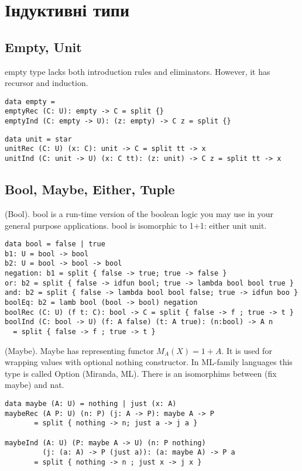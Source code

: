 \section{Індуктивні типи}

\subsection{Empty, Unit}

empty type lacks both introduction rules and eliminators. However, it has recursor and induction.

\begin{lstlisting}
data empty =
emptyRec (C: U): empty -> C = split {}
emptyInd (C: empty -> U): (z: empty) -> C z = split {}
\end{lstlisting}

\begin{lstlisting}
data unit = star
unitRec (C: U) (x: C): unit -> C = split tt -> x
unitInd (C: unit -> U) (x: C tt): (z: unit) -> C z = split tt -> x
\end{lstlisting}

\subsection{Bool, Maybe, Either, Tuple}

\begin{definition} (Bool).
bool is a run-time version of the boolean logic you may use
in your general purpose applications. bool is isomorphic
to 1+1: either unit unit.
\begin{lstlisting}
data bool = false | true
b1: U = bool -> bool
b2: U = bool -> bool -> bool
negation: b1 = split { false -> true; true -> false }
or: b2 = split { false -> idfun bool; true -> lambda bool bool true }
and: b2 = split { false -> lambda bool bool false; true -> idfun boo }
boolEq: b2 = lamb bool (bool -> bool) negation
boolRec (C: U) (f t: C): bool -> C = split { false -> f ; true -> t }
boolInd (C: bool -> U) (f: A false) (t: A true): (n:bool) -> A n
  = split { false -> f ; true -> t }
\end{lstlisting}
\end{definition}

\begin{definition} (Maybe).
Maybe has representing functor $M_A(X) = 1 + A$.
It is used for wrapping values with optional nothing constructor.
In ML-family languages this type is called Option (Miranda, ML).
There is an isomorphims between (fix maybe) and nat.
\begin{lstlisting}
data maybe (A: U) = nothing | just (x: A)
maybeRec (A P: U) (n: P) (j: A -> P): maybe A -> P
       = split { nothing -> n; just a -> j a }

maybeInd (A: U) (P: maybe A -> U) (n: P nothing)
         (j: (a: A) -> P (just a)): (a: maybe A) -> P a
       = split { nothing -> n ; just x -> j x }
\end{lstlisting}
\end{definition}

